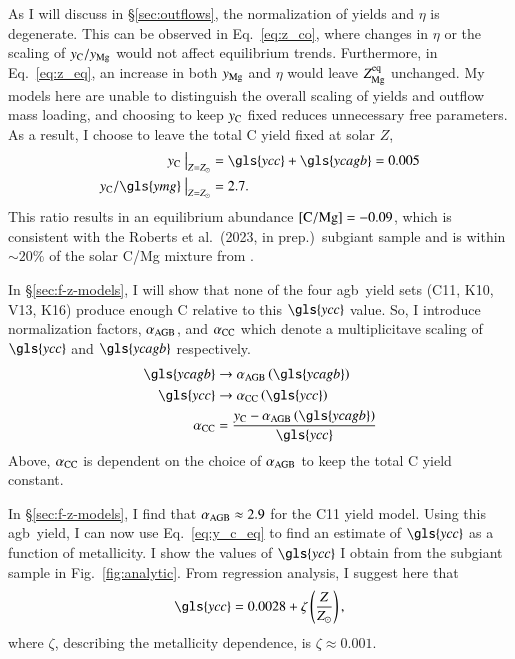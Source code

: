 \documentclass[12pt,oneside,letterpaper]{report}
\newcommand{\agb}{\gls{agb}}
\newcommand{\Ycc}{\gls{ycc}}
\newcommand{\Yct}{\ensuremath{y_{\rm C}}}
\newcommand{\Yoc}{\gls{ymg}}
\newcommand{\Ycagb}{\gls{ycagb}}
\newcommand{\citetjack}{Roberts et al.~(2023, in prep.)}
\newcommand{\about}[1]{${\sim} #1$}
\begin{document}
As I will discuss in \S\ref{sec:outflows}, the normalization of yields and $\eta$ is degenerate. This can be observed in Eq.~\ref{eq:z_co}, where changes in $\eta$ or the scaling of $y_{\rm C}/y_{\rm Mg}$ would not affect equilibrium trends. Furthermore, in Eq.~\ref{eq:z_eq}, an increase in both $y_{\rm Mg}$ and $\eta$ would leave $Z_{\rm Mg}^{\rm eq}$ unchanged. My models here are unable to distinguish the overall scaling of yields and outflow mass loading, and choosing to keep $y_{\rm C}$ fixed reduces unnecessary free parameters. 
%
As a result, I choose to leave the total C yield fixed at solar $Z$,
\begin{subequations}
    \begin{align}
        \Yct~\big\vert_{Z=Z_\odot} &= \Ycc + \Ycagb = 0.005 \\
        \Yct/\Yoc~\big\vert_{Z=Z_\odot} &= 2.7.
    \end{align}
\end{subequations}
This ratio results in an equilibrium abundance ${\rm [C/Mg]} = -0.09$, which is consistent with the \citetjack~subgiant sample and is within \about{20\%} of the solar C/Mg mixture from \citet{asplund+09}.

In \S\ref{sec:f-z-models}, I will show that none of the four \agb\ yield sets (C11, K10, V13, K16) produce enough C relative to this $\Ycc$ value. So, I introduce normalization factors, $\alpha_{\rm AGB}$, and $\alpha_{\rm CC}$ which denote a multiplicitave scaling of $\Ycc$ and $\Ycagb$ respectively. 
\begin{subequations} \label{eq:alpha}
    \begin{align}
        \Ycagb &\rightarrow \alpha_{\rm AGB} \left(\Ycagb\right) \\
        \Ycc &\rightarrow \alpha_{\rm CC} \left(\Ycc\right)\\
        \alpha_{\rm CC} &= \frac{\Yct - \alpha_{\rm AGB} \left(\Ycagb\right)}{\Ycc}
    \end{align}
\end{subequations}
Above, $\alpha_{\rm CC}$ is dependent on the choice of $\alpha_{\rm AGB}$ to keep the total C yield constant. 

In \S\ref{sec:f-z-models}, I find that $\alpha_{\rm AGB}\approx 2.9$ for the C11 yield model. Using this \agb\ yield, I can now use Eq.~\ref{eq:y_c_eq} to find an estimate of $\Ycc$ as a function of metallicity. I show the values of $\Ycc$ I obtain from the subgiant sample in Fig.~\ref{fig:analytic}. From regression analysis, I suggest here that
\begin{equation}
    \Ycc = 0.0028 + \zeta\left(\frac{Z}{Z_\odot}\right),
\end{equation}
where $\zeta$, describing the metallicity dependence, is $\zeta\approx0.001$.
\end{document}
